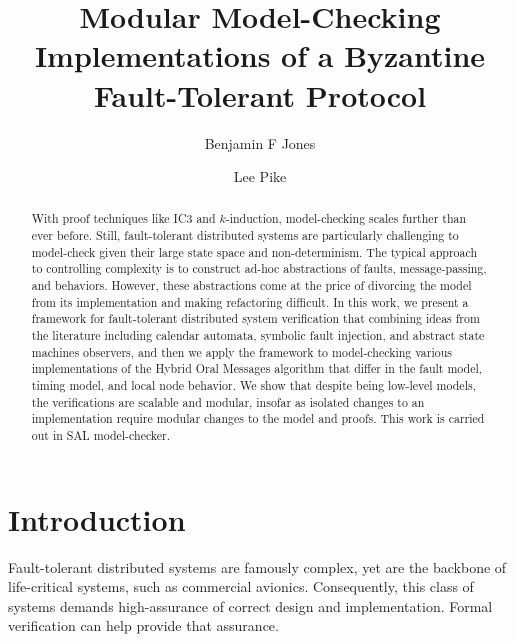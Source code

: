 \documentclass{llncs/llncs}
\newcommand{\lee}[1]{ } %
\newcommand{\lee}[1]{ {\color{blue}$<$lee: #1$>$} } %
\begin{document}
\title{Modular Model-Checking Implementations of a Byzantine Fault-Tolerant Protocol}

\author{Benjamin F Jones \and Lee Pike}


\maketitle

\begin{abstract}
With proof techniques like IC3 and $k$-induction, model-checking scales further
than ever before.  Still, fault-tolerant distributed systems are particularly
challenging to model-check given their large state space and
non-determinism. The typical approach to controlling complexity is to construct
ad-hoc abstractions of faults, message-passing, and behaviors.  However, these
abstractions come at the price of divorcing the model from its implementation
and making refactoring difficult. In this work, we present a framework for
fault-tolerant distributed system verification that combining ideas from the literature including calendar automata,
symbolic fault injection, and abstract state machines observers, and then we apply the framework to model-checking various implementations of the Hybrid Oral Messages algorithm that differ in the fault model, timing model, and local node behavior. We show that despite being low-level models, the verifications are scalable and modular, insofar as isolated changes to an implementation require modular changes to the model and proofs.
This work is carried out in SAL model-checker.
\end{abstract}

\lee{grep for synchronous observers section references}

\section{Introduction}

Fault-tolerant distributed systems are famously complex, yet are the backbone of life-critical systems, such as commercial avionics. Consequently, this class of systems demands high-assurance of correct design and implementation. Formal verification can help provide that assurance.
\end{document}
